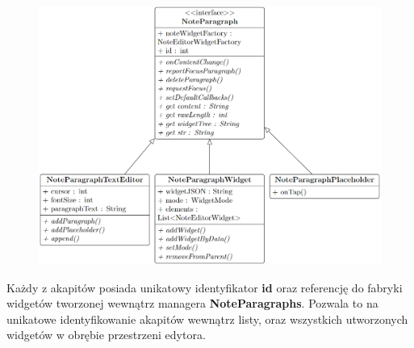 







\begin{figure}[ht]
    \centering
    \includegraphics[width=\linewidth]{images/UML_klas.png}
    \label{fig:uml}
\end{figure}

\newpage

Każdy z akapitów posiada unikatowy identyfikator \textbf{id} oraz referencję do fabryki widgetów tworzonej wewnątrz managera \textbf{NoteParagraphs}.
Pozwala to na unikatowe identyfikowanie akapitów wewnątrz listy, oraz wszystkich utworzonych widgetów w obrębie przestrzeni edytora.

